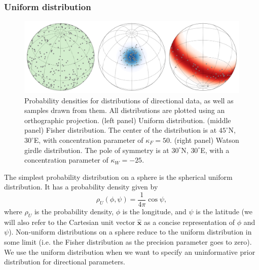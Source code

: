 \documentclass[11pt,letterpaper]{article}
\begin{document}
\subsubsection*{Uniform distribution}
\begin{figure}
\centering
\includegraphics[width=\textwidth]{fig_direction_distributions.png}
\caption[Spherical probability distributions.]{Probability densities for distributions of directional data, as well as samples drawn from them. All distributions are plotted using an orthographic projection. (left panel) Uniform distribution. (middle panel) Fisher distribution. The center of the distribution is at $45^\circ$N, $30^\circ$E, with concentration parameter of $\kappa_F=50$. (right panel) Watson girdle distribution. The pole of symmetry is at $30^\circ$N, $30^\circ$E, with a concentration parameter of $\kappa_W=-25$.}
\label{fig:distributions}
\end{figure}

The simplest probability distribution on a sphere is the spherical uniform distribution. It has a probability density given by
\begin{equation}
  \rho_U(\phi, \psi) = \frac{1}{4 \pi} \cos \psi,
\end{equation}
where $\rho_U$ is the probability density, $\phi$ is the longitude, and $\psi$ is the latitude (we will also refer to the Cartesian unit vector $\hat{\mathbf{x}}$ as a concise representation of $\phi$ and $\psi$). Non-uniform distributions on a sphere reduce to the uniform distribution in some limit (i.e. the Fisher distribution as the precision parameter goes to zero). We use the uniform distribution when we want to specify an uninformative prior distribution for directional parameters.
\end{document}
